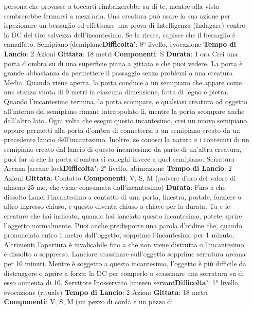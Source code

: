 \begin{multicols}{2}
persona che provasse a toccarti rimbalzerebbe su di te,
mentre alla vista sembrerebbe fermarsi a mezz’aria.
Una creatura può usare la sua azione per ispezionare
un bersaglio ed effettuare una prova di Intelligenza
(Indagare) contro la DC del tiro salvezza 
dell’incantesimo. Se la riesce, capisce che il bersaglio è
camuffato.
Semipiano
[demiplane\textbf{Difficolta'}:
8° livello, evocazione
\textbf{Tempo di Lancio}: 2 Azioni
\textbf{Gittata}: 18 metri
\textbf{Componenti}: S
\textbf{Durata}: 1 ora
Crei una porta d’ombra su di una superficie piana a
gittata e che puoi vedere. La porta è grande
abbastanza da permettere il passaggio senza problemi
a una creatura Media. Quando viene aperta, la porta
conduce a un semipiano che appare come una stanza
vuota di 9 metri in ciascuna dimensione, fatta di legno e
pietra. Quando l’incantesimo termina, la porta
scompare, e qualsiasi creatura od oggetto all’interno del
semipiano rimane intrappolato lì, mentre la porta
scompare anche dall’altro lato.
Ogni volta che esegui questo incantesimo, crei un
nuovo semipiano, oppure permetti alla porta d’ombra di
connettersi a un semipiano creato da un precedente
lancio dell’incantesimo. Inoltre, se conosci la natura e i
contenuti di un semipiano creato dal lancio di questo
incantesimo da parte di un’altra creatura, puoi far sì che
la porta d’ombra si colleghi invece a quel semipiano.
Serratura Arcana
[arcane lock\textbf{Difficolta'}:
2° livello, abiurazione
\textbf{Tempo di Lancio}: 2 Azioni
\textbf{Gittata}: Contatto
\textbf{Componenti}: V, S, M (polvere d’oro del valore di
almeno 25 mo, che viene consumata dall’incantesimo)
\textbf{Durata}: Fino a che dissolto
Lanci l’incantesimo a contatto di una porta, finestra,
portale, forziere o altro ingresso chiuso, e questo
diventa chiuso a chiave per la durata. Tu e le creature
che hai indicato, quando hai lanciato questo
incantesimo, potete aprire l’oggetto normalmente. Puoi
anche predisporre una parola d’ordine che, quando
pronunciata entro 1 metro dall’oggetto, sopprime
l’incantesimo per 1 minuto. Altrimenti l’apertura è
invalicabile fino a che non viene distrutta o
l’incantesimo è dissolto o soppresso. Lanciare
scassinare sull’oggetto sopprime serratura arcana per
10 minuti.
Mentre è soggetto a questo incantesimo, l’oggetto è più
difficile da distruggere o aprire a forza; la DC per
romperlo o scassinare una serratura su di esso
aumenta di 10.
Servitore Inosservato
[unseen servant\textbf{Difficolta'}:
1° livello, evocazione (rituale)
\textbf{Tempo di Lancio}: 2 Azioni
\textbf{Gittata}: 18 metri
\textbf{Componenti}: V, S, M (un pezzo di corda e un pezzo di

\end{multicols}
